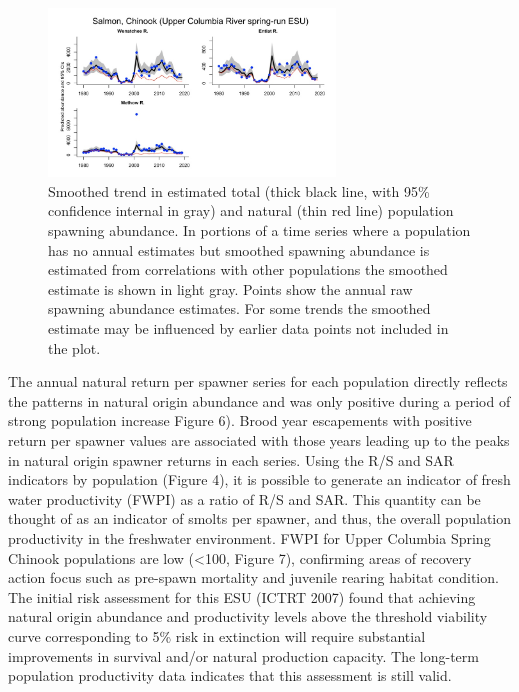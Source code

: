 \documentclass[
  letterpaper,
  oneside,
  open=any]{scrbook}
\begin{document}
\begin{figure}

{\centering \includegraphics[width=3in,height=\textheight]{content/Interior_Columbia/../../media/image10.jpg}

}

\caption{\label{fig-UC-Spr-Chinook-smoothed-trends}Smoothed trend in
estimated total (thick black line, with 95\% confidence internal in
gray) and natural (thin red line) population spawning abundance. In
portions of a time series where a population has no annual estimates but
smoothed spawning abundance is estimated from correlations with other
populations the smoothed estimate is shown in light gray. Points show
the annual raw spawning abundance estimates. For some trends the
smoothed estimate may be influenced by earlier data points not included
in the plot.}

\end{figure}

The annual natural return per spawner series for each population
directly reflects the patterns in natural origin abundance and was only
positive during a period of strong population increase Figure 6). Brood
year escapements with positive return per spawner values are associated
with those years leading up to the peaks in natural origin spawner
returns in each series. Using the R/S and SAR indicators by population
(Figure 4), it is possible to generate an indicator of fresh water
productivity (FWPI) as a ratio of R/S and SAR. This quantity can be
thought of as an indicator of smolts per spawner, and thus, the overall
population productivity in the freshwater environment. FWPI for Upper
Columbia Spring Chinook populations are low (\textless100, Figure 7),
confirming areas of recovery action focus such as pre-spawn mortality
and juvenile rearing habitat condition. The initial risk assessment for
this ESU (ICTRT 2007) found that achieving natural origin abundance and
productivity levels above the threshold viability curve corresponding to
5\% risk in extinction will require substantial improvements in survival
and/or natural production capacity. The long-term population
productivity data indicates that this assessment is still valid.
\end{document}
